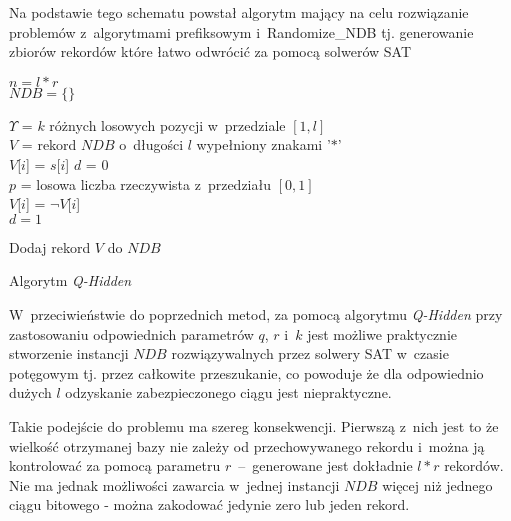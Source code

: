   Na podstawie tego schematu powstał algorytm mający na celu rozwiązanie problemów z~algorytmami prefiksowym i~Randomize\_NDB tj. generowanie zbiorów rekordów które łatwo odwrócić za pomocą solwerów SAT\cite{HARD-NDB}

 \begin{algorithm}[!htb]
    \SetAlgoLined
    
    $n = l * r$\\
    $NDB = \{\}$\\
    {
        $\Upsilon$ = $k$ różnych losowych pozycji w~przedziale $[1, l]$\\
        $V$ = rekord $NDB$ o~długości $l$ wypełniony znakami '$*$'\\
        {
            $V$[$i$] = $s$[$i$]
        }
        $d$ = 0\\
        {
            {
                $p$ = losowa liczba rzeczywista z~przedziału $[0, 1]$\\ 
                {
                    $V$[$i$] = $\neg V$[$i$]\\
                    $d = 1$
                }
            }    
        }
        
    
        Dodaj rekord $V$ do $NDB$
    } 
    
    \caption{Algorytm \textit{Q-Hidden}}
    \label{alg:qhidden}
\end{algorithm}


W~przeciwieństwie do poprzednich metod, za pomocą algorytmu \textit{Q-Hidden} przy zastosowaniu odpowiednich
parametrów $q$, $r$ i~$k$ jest możliwe praktycznie stworzenie instancji $NDB$ rozwiązywalnych przez solwery SAT 
w~czasie potęgowym tj. przez całkowite przeszukanie, co powoduje że dla odpowiednio dużych $l$ odzyskanie 
zabezpieczonego ciągu jest niepraktyczne.

Takie podejście do problemu ma szereg konsekwencji. Pierwszą z~nich jest to że wielkość otrzymanej bazy
nie zależy od przechowywanego rekordu i~można ją kontrolować za pomocą parametru $r$~--~generowane
jest dokładnie $l * r$ rekordów. Nie ma jednak możliwości zawarcia w~jednej instancji $NDB$ 
więcej niż jednego ciągu bitowego - można zakodować jedynie zero lub jeden rekord.

